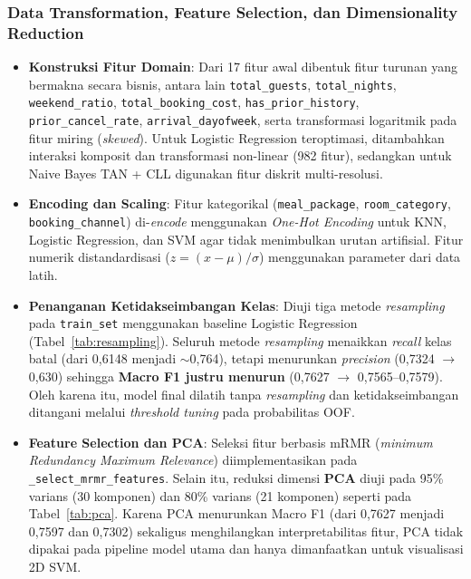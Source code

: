 \documentclass[11pt,a4paper]{article}
\numberwithin{figure}{section}
\numberwithin{table}{section}
\begin{document}
\subsubsection{Data Transformation, Feature Selection, dan Dimensionality Reduction}
\begin{itemize}[leftmargin=1.2cm, itemsep=2pt]
  \item \textbf{Konstruksi Fitur Domain}: Dari 17 fitur awal dibentuk fitur turunan yang bermakna secara bisnis, antara lain \texttt{total\_guests}, \texttt{total\_nights}, \texttt{weekend\_ratio}, \texttt{total\_booking\_cost}, \texttt{has\_prior\_history}, \texttt{prior\_cancel\_rate}, \texttt{arrival\_dayofweek}, serta transformasi logaritmik pada fitur miring (\textit{skewed}). Untuk Logistic Regression teroptimasi, ditambahkan interaksi komposit dan transformasi non-linear (982 fitur), sedangkan untuk Naive Bayes TAN + CLL digunakan fitur diskrit multi-resolusi.
  \item \textbf{Encoding dan Scaling}: Fitur kategorikal (\texttt{meal\_package}, \texttt{room\_category}, \texttt{booking\_channel}) di-\textit{encode} menggunakan \textit{One-Hot Encoding} untuk KNN, Logistic Regression, dan SVM agar tidak menimbulkan urutan artifisial. Fitur numerik distandardisasi ($z = (x-\mu)/\sigma$) menggunakan parameter dari data latih.
  \item \textbf{Penanganan Ketidakseimbangan Kelas}: Diuji tiga metode \textit{resampling} pada \texttt{train\_set} menggunakan baseline Logistic Regression (Tabel~\ref{tab:resampling}). Seluruh metode \textit{resampling} menaikkan \textit{recall} kelas batal (dari 0,6148 menjadi $\sim$0,764), tetapi menurunkan \textit{precision} (0,7324 $\rightarrow$ 0,630) sehingga \textbf{Macro F1 justru menurun} (0,7627 $\rightarrow$ 0,7565--0,7579). Oleh karena itu, model final dilatih tanpa \textit{resampling} dan ketidakseimbangan ditangani melalui \textit{threshold tuning} pada probabilitas OOF.
  \item \textbf{Feature Selection dan PCA}: Seleksi fitur berbasis mRMR (\textit{minimum Redundancy Maximum Relevance}) diimplementasikan pada \texttt{\_select\_mrmr\_features}. Selain itu, reduksi dimensi \textbf{PCA} diuji pada 95\% varians (30 komponen) dan 80\% varians (21 komponen) seperti pada Tabel~\ref{tab:pca}. Karena PCA menurunkan Macro F1 (dari 0,7627 menjadi 0,7597 dan 0,7302) sekaligus menghilangkan interpretabilitas fitur, PCA tidak dipakai pada pipeline model utama dan hanya dimanfaatkan untuk visualisasi 2D SVM.
\end{itemize}
\end{document}
